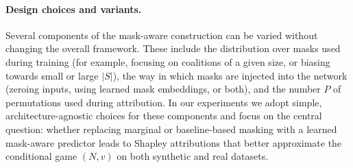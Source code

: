 \documentclass{article}
\begin{document}
\paragraph{Design choices and variants.}
Several components of the mask-aware construction can be varied without changing the overall framework.
These include the distribution over masks used during training (for example, focusing on coalitions of a given size, or biasing towards small or large $|S|$), the way in which masks are injected into the network (zeroing inputs, using learned mask embeddings, or both), and the number $P$ of permutations used during attribution.
In our experiments we adopt simple, architecture-agnostic choices for these components and focus on the central question: whether replacing marginal or baseline-based masking with a learned mask-aware predictor leads to Shapley attributions that better approximate the conditional game $(N, v)$ on both synthetic and real datasets.

\end{document}
